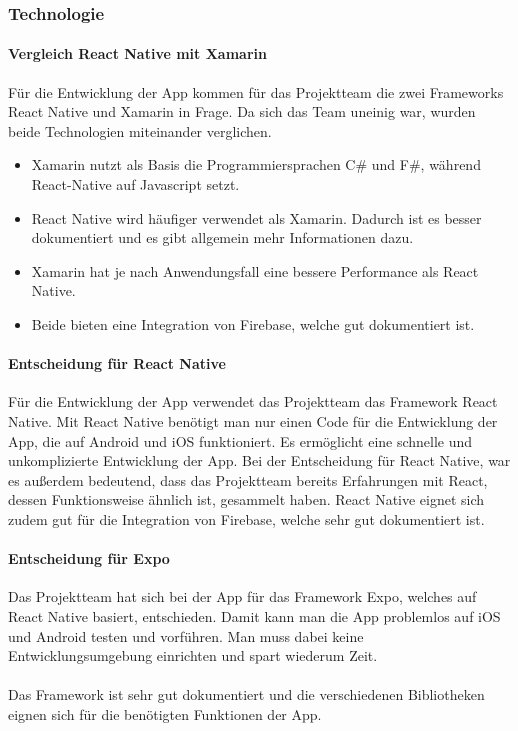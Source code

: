 \subsubsection{Technologie}
\paragraph{Vergleich React Native mit Xamarin}Für die Entwicklung der App kommen für das Projektteam die zwei Frameworks React Native und Xamarin in Frage. Da sich das Team uneinig war, wurden beide Technologien miteinander verglichen.\\

\begin{itemize}
    \item Xamarin nutzt als Basis die Programmiersprachen C\# und F\#, während React-Native auf Javascript setzt.
    \item React Native wird häufiger verwendet als Xamarin. Dadurch ist es besser dokumentiert und es gibt allgemein mehr Informationen dazu.
    \item Xamarin hat je nach Anwendungsfall eine bessere Performance als React Native.
    \item Beide bieten eine Integration von Firebase, welche gut dokumentiert ist.
\end{itemize}\cite{vergleich}

\paragraph{Entscheidung für React Native}Für die Entwicklung der App verwendet das Projektteam das Framework React Native. Mit React Native benötigt man nur einen Code für die Entwicklung der App, die auf Android und iOS funktioniert. Es ermöglicht eine schnelle und unkomplizierte Entwicklung der App. Bei der Entscheidung für React Native, war es außerdem bedeutend, dass das Projektteam bereits Erfahrungen mit React, dessen Funktionsweise ähnlich ist, gesammelt haben. React Native eignet sich zudem gut für die Integration von Firebase, welche sehr gut dokumentiert ist.\cite{reactnative}\\

\paragraph{Entscheidung für Expo}Das Projektteam hat sich bei der App für das Framework Expo, welches auf React Native basiert, entschieden. Damit kann man die App problemlos auf iOS und Android testen und vorführen. Man muss dabei keine Entwicklungsumgebung einrichten und spart wiederum Zeit.\\ \\
Das Framework ist sehr gut dokumentiert und die verschiedenen Bibliotheken eignen sich für die benötigten Funktionen der App.\\
